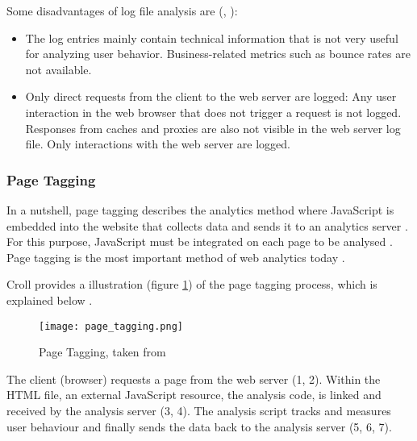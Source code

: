 
Some disadvantages of log file analysis are (\cite{2011Marek}, \cite{2015Zheng}):

\begin{itemize}
\item The log entries mainly contain technical information that is not very useful for analyzing user behavior. Business-related metrics such as bounce rates are not available. %
\item Only direct requests from the client to the web server are logged: Any user interaction in the web browser that does not trigger a request is not logged. Responses from caches and proxies are also not visible in the web server log file. Only interactions with the web server are logged.
\end{itemize}



\subsubsection{Page Tagging} %
\label{subsubsection:page_tagging}

In a nutshell, page tagging describes the analytics method where JavaScript is embedded into the website that collects data and sends it to an analytics server \cite{2011Marek}.
For this purpose, JavaScript must be integrated on each page to be analysed \cite{2009Waisberg}.
Page tagging is the most important method of web analytics today \cite{2015Zheng}.

Croll provides a illustration (figure \ref{figure:page_tagging}) of the page tagging process, which is explained below \cite{2009Croll}.

\begin{figure}[h!]
\begin{center}
\texttt{[image: page\_tagging.png]}
\caption[Page Tagging]{Page Tagging, taken from \cite{2009Croll}}
\label{figure:page_tagging}
\end{center}
\end{figure}

The client (browser) requests a page from the web server (1, 2).
Within the HTML file, an external JavaScript resource, the analysis code, is linked and received by the analysis server (3, 4).
The analysis script tracks and measures user behaviour and finally sends the data back to the analysis server (5, 6, 7).

